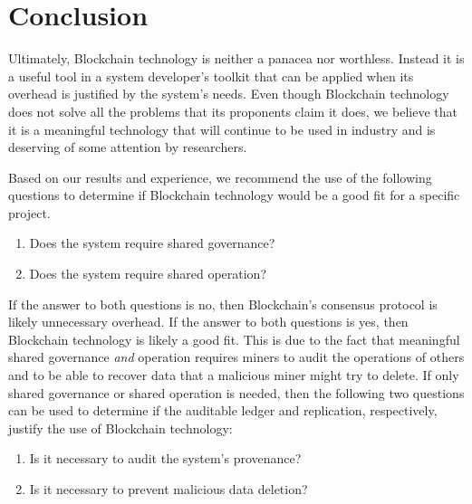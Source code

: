 



\section{Conclusion}
Ultimately, Blockchain technology is neither a panacea nor worthless.
Instead it is a useful tool in a system developer's toolkit that can be applied when its overhead is justified by the system's needs.
Even though Blockchain technology does not solve all the problems that its 
proponents claim it does, we believe that it is a meaningful technology that 
will continue to be used in industry and is deserving of some attention by 
researchers.

Based on our results and experience, we recommend the use of the following 
questions to determine if Blockchain technology would be a good fit for a 
specific project.%

\begin{enumerate}
	\item Does the system require shared governance?
	\item Does the system require shared operation?
\end{enumerate}

If the answer to both questions is no, then Blockchain's consensus protocol is 
likely unnecessary overhead. If the answer to both questions is yes, then 
Blockchain technology is likely a good fit. This is due to the fact that 
meaningful shared governance \emph{and} operation requires miners to audit the 
operations of others and to be able to recover data that a malicious miner 
might try to delete. %
If only shared governance or shared operation is needed, then the following two 
questions can be used to determine if the auditable ledger and replication, 
respectively, justify the use of Blockchain technology:

\begin{enumerate}[start=3]
	\item Is it necessary to audit the system's provenance?
	\item Is it necessary to prevent malicious data deletion?
\end{enumerate}

